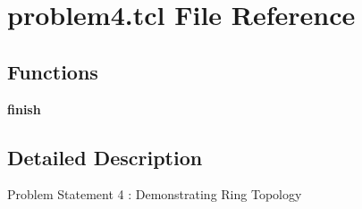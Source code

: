 \hypertarget{problem4_8tcl}{}\section{problem4.\+tcl File Reference}
\label{problem4_8tcl}
\subsection*{Functions}
\begin{DoxyCompactItemize}
\item 
\mbox{\label{problem4_8tcl_a30728837c246b65ef76298af0101d99c}} 
{\bfseries finish}
\end{DoxyCompactItemize}


\subsection{Detailed Description}
Problem Statement 4 \+: Demonstrating Ring Topology

\begin{DoxyVerb}
\end{DoxyVerb}
